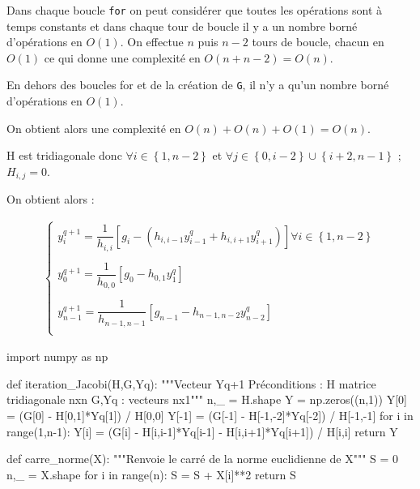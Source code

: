 Dans chaque boucle \texttt{for} on peut considérer que toutes les opérations sont à temps constants et dans chaque tour de boucle il y a un nombre borné d'opérations en $O(1)$.
On effectue $n$ puis $n-2$ tours de boucle, chacun en $O(1)$ ce qui donne une complexité en $O(n+n-2) = O(n)$.

En dehors des boucles for et de la création de \texttt G, il n'y a qu'un nombre borné d'opérations en $O(1)$.

On obtient alors une complexité en $O(n)+O(n)+O(1) = O(n)$.

\question{} 

H est tridiagonale donc $\forall i \in \left\{1,n-2\right\}$ et $\forall j \in \left\{0,i-2\right\}\cup \left\{i+2,n-1\right\}$ ; $H_{i,j}=0$.

On obtient alors : 

\begin{align*}
\left\{
\begin{array}{c}
y_i^{q+1}=\dfrac{1}{h_{i,i}}\left[g_i-\left(h_{i,i-1}y^q_{i-1}+h_{i,i+1}y^q_{i+1}\right)\right]\forall i\in\left\{1,n-2\right\}\\
\\
y_0^{q+1}=\dfrac{1}{h_{0,0}}\left[g_0 -h_{0,1}y^q_{1}\right]\\
\\
y_{n-1}^{q+1}=\dfrac{1}{h_{n-1,n-1}}\left[g_{n-1}-h_{n-1,n-2}y^q_{n-2}\right]\\
\end{array}
\right.
\end{align*}  

\question{}


\begin{pyverbatim}
import numpy as np

def iteration_Jacobi(H,G,Yq):
    """Vecteur Yq+1 
    Préconditions : H matrice tridiagonale nxn
                    G,Yq : vecteurs nx1"""
    n,_ = H.shape
    Y = np.zeros((n,1))
    Y[0] = (G[0] - H[0,1]*Yq[1]) / H[0,0]
    Y[-1] = (G[-1] - H[-1,-2]*Yq[-2]) / H[-1,-1]
    for i in range(1,n-1):
        Y[i] = (G[i] - H[i,i-1]*Yq[i-1] - H[i,i+1]*Yq[i+1]) / H[i,i]
    return Y
\end{pyverbatim}



\question{}

\begin{pyverbatim}
def carre_norme(X):
    """Renvoie le carré de la norme euclidienne de X"""
    S = 0
    n,_ = X.shape
    for i in range(n):
        S = S + X[i]**2
    return S
\end{pyverbatim}


